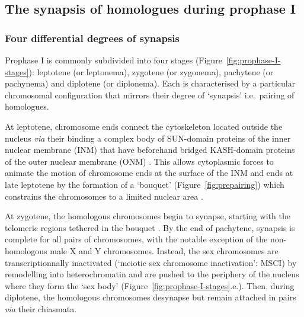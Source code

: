 \subsection{The synapsis of homologues during prophase I}
\label{chap2:prophase-I}

\subsubsection{Four differential degrees of synapsis}
Prophase I is commonly subdivided into four stages (Figure~\ref{fig:prophase-I-stages}): leptotene (or leptonema), zygotene (or zygonema), pachytene (or pachynema) and diplotene (or diplonema).
Each is characterised by a particular chromosomal configuration that mirrors their degree of ‘synapsis’ i.e.\ pairing of homologues.

At leptotene, chromosome ends connect the cytoskeleton located outside the nucleus \citep{scherthan1996centromere} \textit{via} their binding a complex body of SUN-domain proteins of the inner nuclear membrane (INM) that have beforehand bridged KASH-domain proteins of the outer nuclear membrane (ONM) \citep{tzur2006sun, yanowitz2010meiosis}.
This allows cytoplasmic forces to animate the motion of chromosome ends at the surface of the INM \citep{penkner2009meiotic} and ends at late leptotene by the formation of a ‘bouquet’ (Figure~\ref{fig:prepairing}) \citep{zickler1998leptotene} which constrains the chromosomes to a limited nuclear area \citep{zickler2006early}.

At zygotene, the homologous chromosomes begin to synapse, starting with the telomeric regions tethered in the bouquet \citep{pfeifer2003sex}.
By the end of pachytene, synapsis is complete for all pairs of chromosomes, with the notable exception of the non-homologous male X and Y chromosomes.
Instead, the sex chromosomes are transcriptionnally inactivated (‘meiotic sex chromosome inactivation’: MSCI) by remodelling into heterochromatin \citep{fernandez2003h2ax} and are pushed to the periphery of the nucleus where they form the ‘sex body’ \citep{handel2004xy} (Figure~\ref{fig:prophase-I-stages}.e.).
Then, during diplotene, the homologous chromosomes desynapse but remain attached in pairs \textit{via} their chiasmata.


